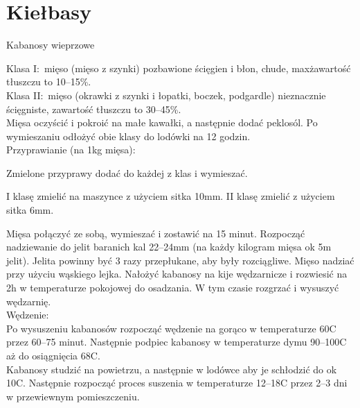 \documentclass[a4paper,12pt]{article}
\begin{document}
\newpage

\newpage%
\section{Kiełbasy}

\begin{recipe}{Kabanosy wieprzowe}{}{}


\freeform%
Klasa I:\ mięso  (mięso z szynki) pozbawione ścięgien i błon, chude, max\. zawartość tłuszczu to 10--15\%. \\
Klasa II:\ mięso (okrawki z szynki i łopatki, boczek, podgardle) nieznacznie ścięgniste, zawartość tłuszczu to 30--45\%. \\

Mięsa oczyścić i pokroić na małe kawałki, a następnie dodać peklosól.
Po wymieszaniu odłożyć obie klasy do lodówki na 12 godzin. \\

\freeform%
Przyprawianie (na 1kg mięsa):

Zmielone przyprawy dodać do każdej z klas i wymieszać.

I klasę zmielić na maszynce z użyciem sitka 10mm. 
II klasę zmielić z użyciem sitka 6mm.

\freeform%
Mięsa połączyć ze sobą, wymieszać i zostawić na 15 minut.
Rozpocząć nadziewanie do jelit baranich kal 22--24mm (na każdy kilogram mięsa ok 5m jelit).
Jelita powinny być 3 razy przepłukane, aby były rozciągliwe. Mięso nadziać przy użyciu wąskiego lejka.
Nałożyć kabanosy na kije wędzarnicze i rozwiesić na 2h w temperaturze pokojowej do osadzania.
W tym czasie rozgrzać i wysuszyć wędzarnię. \\

Wędzenie: \\
Po wysuszeniu kabanosów rozpocząć wędzenie na gorąco w temperaturze 60\0C przez 60--75 minut.
Następnie podpiec kabanosy w temperaturze dymu 90--100\0C aż do osiągnięcia 68\0C. \\

Kabanosy studzić na powietrzu, a następnie w lodówce aby je schłodzić do ok 10\0C.
Następnie rozpocząć proces suszenia w temperaturze 12--18\0C przez 2--3 dni w przewiewnym pomieszczeniu.


\end{recipe}
\end{document}
